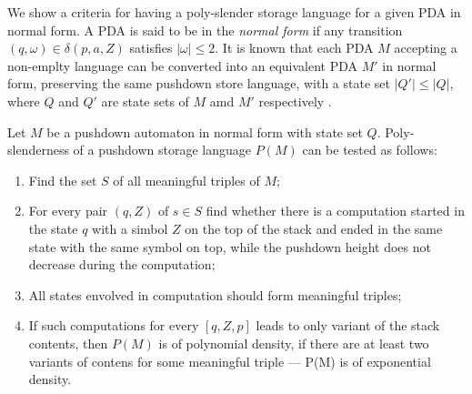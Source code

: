 We show a criteria for having a poly-slender storage language for a given PDA in normal form. A PDA is said to be in the \textit{normal form} if any transition
$(q, \omega) \in \delta(p, a, Z)$ satisfies $|\omega| \le 2$. It is known that each PDA $M$ accepting a non-emplty language can be converted into an equivalent PDA $M'$ in normal form, preserving the same pushdown store language, with a state set $|Q'| \le |Q|$, where $Q$ and $Q'$ are state sets of $M$ amd $M'$ respectively \cite*{Ginsburgbook, Malcher}.
\begin{theorem}
Let $M$ be a pushdown automaton in normal form with state set $Q$. Poly-slenderness of a pushdown storage language $P(M)$ can be tested as follows:
\begin{enumerate}
\item Find the set $S$ of all meaningful triples of $M$;
\item For every pair $(q, Z)$ of $s \in S$ find whether there is a computation started in the state $q$ with a simbol $Z$ on the top of the stack and ended in the same state with the same symbol on top, while the pushdown height does not decrease during the computation;
\item All states envolved in computation should form meaningful triples;
\item If such computations for every $[q, Z, p]$ leads to only variant of the stack contents, then $P(M)$ is of polynomial density, if there are at least two variants of contens for some meaningful triple --- P(M) is of exponential density.
\end{enumerate}
\end{theorem}
